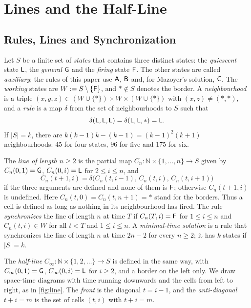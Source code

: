 \section{Lines and the Half-Line}\label{sec:lines}

\subsection{Rules, Lines and Synchronization}

Let $S$ be a finite set of \emph{states} that contains three distinct states:
the \emph{quiescent} state $\mathsf L$, the \emph{general} $\mathsf G$ and the
\emph{firing} state $\mathsf F$. The other states are called \emph{auxiliary}; the
rules of this paper use $\mathsf A$, $\mathsf B$ and, for Mazoyer's solution, $\mathsf C$. The
\emph{working} states are $W:=S\setminus\{\mathsf F\}$, and $\ast\notin S$ denotes the
border. A \emph{neighbourhood} is a triple $(x,y,z)\in(W\cup\{\ast\})\times
W\times(W\cup\{\ast\})$ with $(x,z)\ne(\ast,\ast)$, and a \emph{rule} is a map
$\delta$ from the set of neighbourhoods to $S$ such that
\begin{equation}\label{eq:quiescence}
\delta(\mathsf L,\mathsf L,\mathsf L)=\delta(\mathsf L,\mathsf L,\ast)=\mathsf L .
\end{equation}
If $|S|=k$, there are $k(k-1)k-(k-1)=(k-1)^2(k+1)$ neighbourhoods: $45$ for
four states, $96$ for five and $175$ for six.

The \emph{line of length $n\ge2$} is the partial map
$C_n:\mathbb N\times\{1,\dots,n\}\to S$ given by $C_n(0,1)=\mathsf G$, $C_n(0,i)=\mathsf L$
for $2\le i\le n$, and
\[
C_n(t+1,i)=\delta\bigl(C_n(t,i-1),\,C_n(t,i),\,C_n(t,i+1)\bigr)
\]
if the three arguments are defined and none of them is $\mathsf F$; otherwise
$C_n(t+1,i)$ is undefined. Here $C_n(t,0)=C_n(t,n+1)=\ast$ stand for the
borders. Thus a cell is defined as long as nothing in its neighbourhood has
fired. The rule \emph{synchronizes} the line of length $n$ at time $T$ if
$C_n(T,i)=\mathsf F$ for $1\le i\le n$ and $C_n(t,i)\in W$ for all $t<T$ and $1\le
i\le n$. A \emph{minimal-time solution} is a rule that synchronizes the line of
length $n$ at time $2n-2$ for every $n\ge2$; it has $k$ states if $|S|=k$.

The \emph{half-line} $C_\infty:\mathbb N\times\{1,2,\dots\}\to S$ is defined in
the same way, with $C_\infty(0,1)=\mathsf G$, $C_\infty(0,i)=\mathsf L$ for $i\ge2$, and a
border on the left only. We draw space-time diagrams with time running
downwards and the cells from left to right, as in \cref{fig:line}. The
\emph{front} is the diagonal $t=i-1$, and the \emph{anti-diagonal} $t+i=m$ is
the set of cells $(t,i)$ with $t+i=m$.

